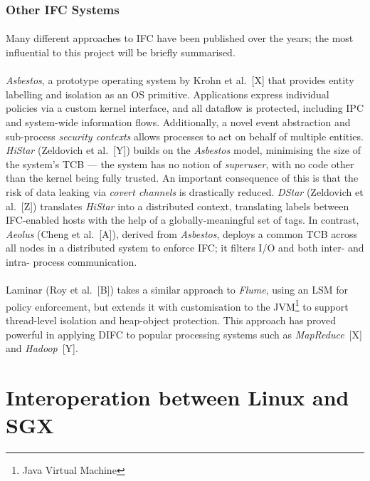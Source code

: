\subsubsection{Other IFC Systems}
\paragraph{} Many different approaches to IFC have been published over the years; the most influential to this project will be briefly summarised.

\paragraph{} \textit{Asbestos}, a prototype operating system by Krohn et al.~[X] that provides entity labelling and isolation as an OS primitive. Applications express individual policies via a custom kernel interface, and all dataflow is protected, including IPC and system-wide information flows. Additionally, a novel event abstraction and sub-process \textit{security contexts} allows processes to act on behalf of multiple entities. \textit{HiStar} (Zeldovich et al.~[Y]) builds on the \textit{Asbestos} model, minimising the size of the system's TCB --- the system has no notion of \textit{superuser}, with no code other than the kernel being fully trusted. An important consequence of this is that the risk of data leaking via \textit{covert channels} is drastically reduced. \textit{DStar} (Zeldovich et al.~[Z]) translates \textit{HiStar} into a distributed context, translating labels between IFC-enabled hosts with the help of a globally-meaningful set of tags. In contrast, \textit{Aeolus} (Cheng et al.~[A]), derived from \textit{Asbestos}, deploys a common TCB across all nodes in a distributed system to enforce IFC; it filters I/O and both inter- and intra- process communication.

\paragraph{} Laminar (Roy et al.~[B]) takes a similar approach to \textit{Flume}, using an LSM for policy enforcement, but extends it with customisation to the JVM\footnote{Java Virtual Machine} to support thread-level isolation and heap-object protection. This approach has proved powerful in applying DIFC to popular processing systems such as \textit{MapReduce}~[X] and \textit{Hadoop}~[Y].


\section{Interoperation between Linux and SGX} 
